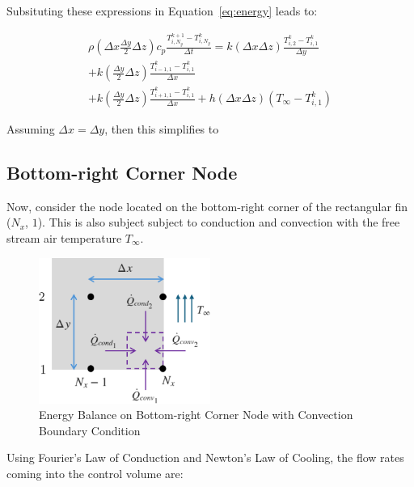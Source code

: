 \documentclass{article}
\newcommand{\ddfrac}[2]{\frac{\displaystyle #1}{\displaystyle #2}}
\begin{document}
Subsituting these expressions in Equation~\eqref{eq:energy} leads to:

\begin{multline*}
    \rho\left(\Delta x \ddfrac{\Delta y}{2} \Delta z\right) c_p \ddfrac{T_{i,N_y}^{k+1} - T_{i,N_y}^k}{\Delta t} = k(\Delta x \Delta z) \ddfrac{T_{i,2}^k - T_{i,1}^k}{\Delta y} \\
    + k(\ddfrac{\Delta y}{2} \Delta z) \ddfrac{T_{i-1,1}^k - T_{i,1}^k}{\Delta x} \\
    + k(\ddfrac{\Delta y}{2} \Delta z) \ddfrac{T_{i+1,1}^k - T_{i,1}^k}{\Delta x}
    + h(\Delta x \Delta z)\left(T_{\infty} - T_{i,1}^k\right)
\end{multline*}

Assuming $\Delta x = \Delta y$, then this simplifies to 
\begin{center}
    \noindent {}        
\end{center}

\pagebreak 

\subsection{Bottom-right Corner Node}
Now, consider the node located on the bottom-right corner of the rectangular fin ($N_x$, $1$). This is also subject subject to conduction and convection with the free stream air temperature $T_{\infty}$.

\begin{figure}[h]
    \centering
    \includegraphics[width=0.5\textwidth]{fig/energyCorner.png}
    \caption{Energy Balance on Bottom-right Corner Node with Convection Boundary Condition}
    \label{fig:energyCorner}
\end{figure}

Using Fourier's Law of Conduction and Newton's Law of Cooling, the flow rates coming into the control volume are:
\end{document}
